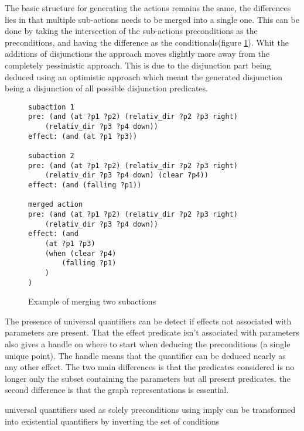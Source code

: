 	The basic structure for generating the actions remains the same, the differences lies in that multiple sub-actions needs to be merged into a single one. This can be done by taking the intersection of the sub-actions preconditions as the preconditions, and having the difference as the conditionals(figure \ref{merge}). Whit the additions of disjunctions the approach moves slightly more away from the completely pessimistic approach. This is due to the disjunction part being deduced using an optimistic approach which meant the generated disjunction being a disjunction of all possible disjunction predicates.
\begin{figure}
	\caption{Example of merging two subactions}
	\label{merge}
		\begin{lstlisting}
subaction 1
pre: (and (at ?p1 ?p2) (relativ_dir ?p2 ?p3 right) 
	(relativ_dir ?p3 ?p4 down))
effect: (and (at ?p1 ?p3))
		
subaction 2
pre: (and (at ?p1 ?p2) (relativ_dir ?p2 ?p3 right) 
	(relativ_dir ?p3 ?p4 down) (clear ?p4))
effect: (and (falling ?p1))
		
merged action
pre: (and (at ?p1 ?p2) (relativ_dir ?p2 ?p3 right) 
	(relativ_dir ?p3 ?p4 down))
effect: (and 
	(at ?p1 ?p3)
	(when (clear ?p4) 
		(falling ?p1)
	)
)
\end{lstlisting}
\end{figure}	

	
	
	


	The presence of universal quantifiers can be detect if effects not associated with parameters are present. That the effect predicate isn't associated with parameters also gives a handle on where to start when deducing the preconditions (a single unique point). The handle means that the quantifier can be deduced nearly as any other effect. The two main differences is that the predicates considered is no longer only the subset containing the parameters but all present predicates. the second  difference is that the graph representations is essential. 
	
	
	universal quantifiers used as solely preconditions using imply can be transformed into existential quantifiers by inverting the set of conditions

